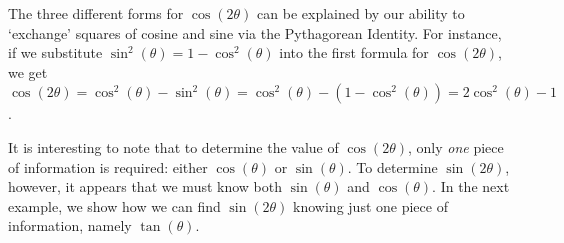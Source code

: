 \documentclass{ximera}
\begin{document}
\smallskip


\smallskip

The three different forms for $\cos(2\theta)$ can be explained by our ability to `exchange' squares of cosine and sine via the Pythagorean Identity.  For instance, if we substitute $\sin^{2}(\theta) = 1 - \cos^{2}(\theta)$ into the first  formula for $\cos(2\theta)$, we get $\cos(2\theta)  = \cos^{2}(\theta) - \sin^{2}(\theta) = \cos^{2}(\theta) - (1 - \cos^{2}(\theta)) = 2 \cos^{2}(\theta) - 1$. 

\smallskip

 It is interesting to note that to determine the value of $\cos(2\theta)$, only \textit{one} piece of information is required: either $\cos(\theta)$ or $\sin(\theta)$.  To determine $\sin(2\theta)$, however, it appears that we must know both $\sin(\theta)$ and $\cos(\theta)$.  In the next example, we show how we can find $\sin(2\theta)$ knowing just one piece of information, namely $\tan(\theta)$.
\end{document}
